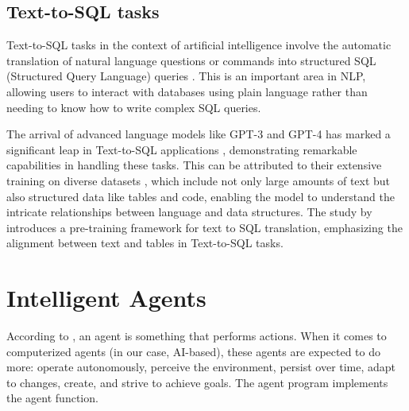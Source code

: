         \subsection{Text-to-SQL tasks} 

            Text-to-SQL tasks in the context of artificial intelligence involve the automatic translation of natural language questions or commands into structured SQL (Structured Query Language) queries \citep{Qin2022}. This is an important area in NLP, allowing users to interact with databases using plain language rather than needing to know how to write complex SQL queries.         
                
            The arrival of advanced language models like GPT-3 and GPT-4 \citep{OpenAImodels} has marked a significant leap in Text-to-SQL applications \citep{Singh2023}, demonstrating remarkable capabilities in handling these tasks. This can be attributed to their extensive training on diverse datasets \citep{Deng2021}, which include not only large amounts of text but also structured data like tables and code, enabling the model to understand the intricate relationships between language and data structures. The study by \citep{Deng2023} introduces a pre-training framework for text to SQL translation, emphasizing the alignment between text and tables in Text-to-SQL tasks.



    \section{Intelligent Agents}         

        According to \citet{Russell2020}, an agent is something that performs actions. When it comes to computerized agents (in our case, AI-based), these agents are expected to do more: operate autonomously, perceive the environment, persist over time, adapt to changes, create, and strive to achieve goals. The agent program implements the agent function.

